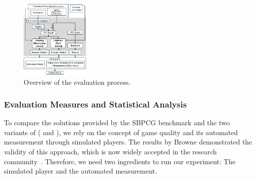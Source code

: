 \begin{table}[tb]
	\centering    
	\caption{\ApproachName{} parameter settings}
	\label{tab:evaluation_parameters}
\end{table}


\begin{figure}[tb]
	\centering
	\includegraphics[width=0.3\textwidth]{Figures/evaluation_process.png}
	\caption{Overview of the evaluation process.}
	\label{fig:evaluation}
\end{figure}

\subsubsection{Evaluation Measures and Statistical Analysis}
To compare the solutions provided by the SBPCG benchmark and the two variants of \ApproachName{} (\ie \simhotep{} and \timhotep{}), we rely on the concept of game quality and its automated measurement through simulated players. The results by Browne \etal demonstrated the validity of this approach, which is now widely accepted in the research community~\cite{browne2010evolutionary}. Therefore, we need two ingredients to run our experiment: The simulated player and the automated measurement.

